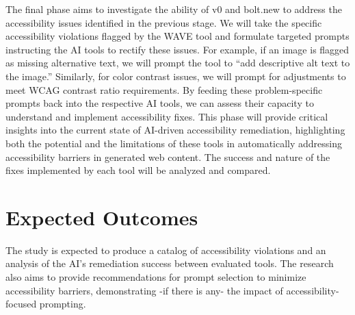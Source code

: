 \documentclass{article}
\begin{document}
The final phase aims to investigate the ability of v0 and bolt.new to address the accessibility issues identified in the previous stage. We will take the specific accessibility violations flagged by the WAVE tool and formulate targeted prompts instructing the AI tools to rectify these issues. For example, if an image is flagged as missing alternative text, we will prompt the tool to ``add descriptive alt text to the image.'' Similarly, for color contrast issues, we will prompt for adjustments to meet WCAG contrast ratio requirements. By feeding these problem-specific prompts back into the respective AI tools, we can assess their capacity to understand and implement accessibility fixes. This phase will provide critical insights into the current state of AI-driven accessibility remediation, highlighting both the potential and the limitations of these tools in automatically addressing accessibility barriers in generated web content. The success and nature of the fixes implemented by each tool will be analyzed and compared.

\section{Expected Outcomes}
The study is expected to produce a catalog of accessibility violations and an analysis of the AI's remediation success between evaluated tools. The research also aims to provide recommendations for prompt selection to minimize accessibility barriers, demonstrating -if there is any- the impact of accessibility-focused prompting.

\pagebreak



\end{document}
